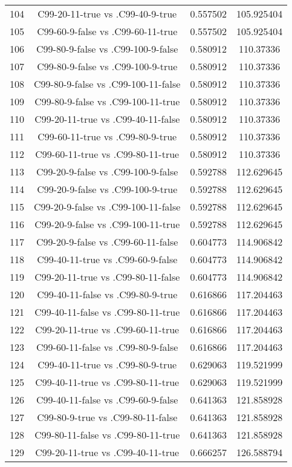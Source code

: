 \documentclass[a4paper,10pt]{article}
\begin{document}
\begin{landscape}
\begin{table}[!htp]
\begin{tabular}{cccc}
104&C99-20-11-true vs .C99-40-9-true&0.557502&105.925404\\
105&C99-60-9-false vs .C99-60-11-true&0.557502&105.925404\\
106&C99-80-9-false vs .C99-100-9-false&0.580912&110.37336\\
107&C99-80-9-false vs .C99-100-9-true&0.580912&110.37336\\
108&C99-80-9-false vs .C99-100-11-false&0.580912&110.37336\\
109&C99-80-9-false vs .C99-100-11-true&0.580912&110.37336\\
110&C99-20-11-true vs .C99-40-11-false&0.580912&110.37336\\
111&C99-60-11-true vs .C99-80-9-true&0.580912&110.37336\\
112&C99-60-11-true vs .C99-80-11-true&0.580912&110.37336\\
113&C99-20-9-false vs .C99-100-9-false&0.592788&112.629645\\
114&C99-20-9-false vs .C99-100-9-true&0.592788&112.629645\\
115&C99-20-9-false vs .C99-100-11-false&0.592788&112.629645\\
116&C99-20-9-false vs .C99-100-11-true&0.592788&112.629645\\
117&C99-20-9-false vs .C99-60-11-false&0.604773&114.906842\\
118&C99-40-11-true vs .C99-60-9-false&0.604773&114.906842\\
119&C99-20-11-true vs .C99-80-11-false&0.604773&114.906842\\
120&C99-40-11-false vs .C99-80-9-true&0.616866&117.204463\\
121&C99-40-11-false vs .C99-80-11-true&0.616866&117.204463\\
122&C99-20-11-true vs .C99-60-11-true&0.616866&117.204463\\
123&C99-60-11-false vs .C99-80-9-false&0.616866&117.204463\\
124&C99-40-11-true vs .C99-80-9-true&0.629063&119.521999\\
125&C99-40-11-true vs .C99-80-11-true&0.629063&119.521999\\
126&C99-40-11-false vs .C99-60-9-false&0.641363&121.858928\\
127&C99-80-9-true vs .C99-80-11-false&0.641363&121.858928\\
128&C99-80-11-false vs .C99-80-11-true&0.641363&121.858928\\
129&C99-20-11-true vs .C99-40-11-true&0.666257&126.588794\\

\end{tabular}
\end{table}
\end{landscape}
\end{document}
